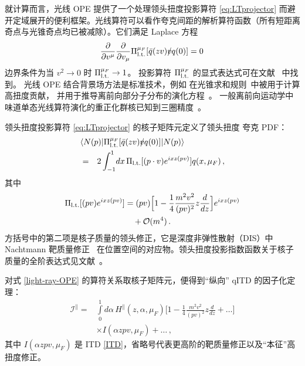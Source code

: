 就计算而言，光线 OPE 提供了一个处理领头扭度投影算符 \eqref{eq:LTprojector} 而避开定域展开的便利框架。光线算符可以看作夸克间距的解析算符函数（所有短距离奇点与光锥奇点均已被减除）。它们满足 Laplace 方程~\cite{Balitsky:1987bk}
\begin{align}
 \frac{\partial}{\partial v^\mu} \frac{\partial}{\partial v_\mu}  \Pi_{\rm l.t.}^{\mu_F}[\bar q (z v ) \slashed{v} q(0)] =0\,
\end{align}
边界条件为当 $v^2 \to 0$ 时 $\Pi_{\rm l.t.}^{\mu_F}\to 1$。
投影算符 $\Pi_{\rm l.t.}^{\mu_F}$ 的显式表达式可在文献~\cite{Balitsky:1987bk,Geyer:1999uq,Geyer:2000ig,Braun:2011dg} 中找到。
光线 OPE 结合背景场方法是标准技术，例如
在光锥求和规则~\cite{Balitsky:1989ry}中被用于计算高扭度贡献，
并用于推导离前向部分子分布的演化方程~\cite{Belitsky:1999hf,Belitsky:1998gc}。
一般离前向运动学中味道单态光线算符演化的重正化群核已知到三圈精度~\cite{Braun:2017cih}。

领头扭度投影算符 \eqref{eq:LTprojector} 的核子矩阵元定义了领头扭度
夸克 PDF：
\begin{eqnarray}
\lefteqn{ \langle N(p)| \Pi_{\rm l.t.}^{\mu_F}[\bar q (zv) \slashed{v} q(0)] |N(p)\rangle}
\notag\\
&=& 2 \int_{-1}^1\!dx\, \Pi_{\rm l.t.}[(p\cdot v) e^{ i x z (pv)}] q(x,\mu_F)\,,
\end{eqnarray}
其中~\cite{Balitsky:1990ck}
\begin{align}
\label{Pi-exp}
\Pi_{\rm l.t.}[(pv) e^{ i x z(pv)}]
&= (pv)\Big[1 - \frac{1}{4} \frac{m^2 v^2}{(pv)^2} z\frac{d}{dz} \Big] e^{ ixz(pv)}
\nonumber\\&\quad
+ \mathcal{O}(m^4)\,.
\end{align}
方括号中的第二项是核子质量的领头修正，它是深度非弹性散射（DIS）中 Nachtmann 靶质量修正~\cite{Nachtmann:1973mr} 在位置空间的对应物。领头扭度投影指数函数关于核子质量的全阶表达式见文献~\cite{Balitsky:1990ck}。

对式 \eqref{light-ray-OPE} 的算符关系取核子矩阵元，便得到``纵向'' qITD 的因子化定理：
\begin{align}
\mathcal{I}^\parallel   = &
 \int\limits_0^1 d\alpha \, H^\parallel(z,\alpha,\mu_F)
  \Big[1 - \frac{1}{4} \frac{m^2 v^2}{(pv)^2} z\frac{d}{dz} +\ldots \Big]\\ & \nonumber
\times I(\alpha z pv , \mu_F)
+\ldots\,,
\end{align}
其中 $I(\alpha z pv,\mu_F)$ 是 ITD \eqref{ITD}，省略号代表更高阶的靶质量修正以及``本征''高扭度修正。

